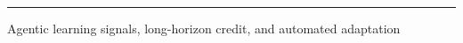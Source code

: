 \begin{frame}[plain]
  \vspace{12mm}
  {\color{DeckInk}\inserttitle\par}
  \vspace{3mm}
  {\color{DeckTeal}\insertsubtitle\par}
  \vspace{10mm}
  {\large\insertauthor\par}
  \vspace{2mm}
  {\normalsize\color{DeckMuted}\insertdate\par}
  \vfill
  {\color{DeckGold}\rule{0.42\textwidth}{2pt}}\par
  \vspace{2mm}
  {\large Agentic learning signals, long-horizon credit, and automated adaptation}
\end{frame}
